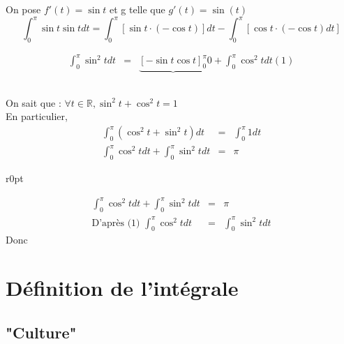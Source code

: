 On pose $f'(t) = \sin t$ et g telle que $g'(t) = \sin (t)$ \[\int_0^\pi \sin t \sin t dt = \int_0^\pi[\sin t \cdot (-\cos t)] dt - \int_0^\pi[\cos t\cdot (-\cos t)dt]\] 

\[\begin{array}{rcl}
		\int_0^\pi \sin^2 t dt &=& \underbrace{[-\sin t \cos t]^\pi_0}{0} + \int_0^\pi \cos^2 t dt (1)
\end{array}\]

\subsection{} On sait que : $\forall t \in \mathbb{R}, \sin^2 t + \cos^2 t = 1$ ~\\

En particulier, \[\begin{array}{rcl}
		\int_0^\pi(\cos^2 t + \sin^2 t)dt &=& \int_0^\pi 1 dt \\
		\int_0^\pi \cos^2 t dt + \int_0^\pi \sin^2 t dt &=& \pi
\end{array}\]

\begin{wrapfigure}[3]{r}{0pt}
\end{wrapfigure}

\[\begin{array}{rcl}
		\int_0^\pi \cos^2 t dt + \int_0^\pi \sin^2 t dt &=& \pi \\
\text{D'après (1) } \int_0^\pi \cos^2 t dt &=& \int_0^\pi \sin^2t dt \end{array}\]
Donc 

\section{Définition de l'intégrale}
\subsection{"Culture"}

